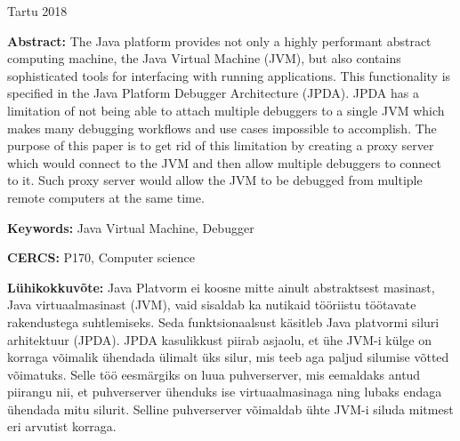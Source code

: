 \documentclass{style/bachelor-thesis}
\begin{document}
\vfill
\centerline{Tartu 2018}


\pagebreak
\listoftodos[Todos]

\pagebreak

\noindent\textbf{\large \articleName}
\vspace*{3ex}
\begin{flushleft}
  \textbf{Abstract:} 
  The Java platform provides not only a highly performant abstract computing machine, the Java Virtual Machine (JVM), but also contains sophisticated tools for interfacing with running applications. 
  This functionality is specified in the Java Platform Debugger Architecture (JPDA).
  JPDA has a limitation of not being able to attach multiple debuggers to a single JVM which makes many debugging workflows and use cases impossible to accomplish.
  The purpose of this paper is to get rid of this limitation by creating a proxy server which would connect to the JVM and then allow multiple debuggers to connect to it. 
  Such proxy server would allow the JVM to be debugged from multiple remote computers at the same time.  
 
\end{flushleft}


\vspace*{3ex}
\begin{flushleft}
  \textbf{Keywords:} Java Virtual Machine, Debugger
\end{flushleft}
\vspace*{3ex}

\noindent\textbf{CERCS:} P170, Computer science

\vspace*{5ex}
\noindent\textbf{\large \articleNameEE}
\vspace*{3ex}

\begin{flushleft}
  \textbf{Lühikokkuvõte:} 
  Java Platvorm ei koosne mitte ainult abstraktsest masinast, Java virtuaalmasinast (JVM), vaid sisaldab ka nutikaid tööriistu töötavate rakendustega suhtlemiseks.
  Seda funktsionaalsust käsitleb Java platvormi siluri arhitektuur (JPDA).
  JPDA kasulikkust piirab asjaolu, et ühe JVM-i külge on korraga võimalik ühendada ülimalt üks silur, mis teeb aga paljud silumise võtted võimatuks.
  Selle töö eesmärgiks on luua puhverserver, mis eemaldaks antud piirangu nii, et puhverserver ühenduks ise virtuaalmasinaga ning lubaks endaga ühendada mitu silurit.
  Selline puhverserver võimaldab ühte JVM-i siluda mitmest eri arvutist korraga.
\end{flushleft}
\vspace*{3ex}
\end{document}
